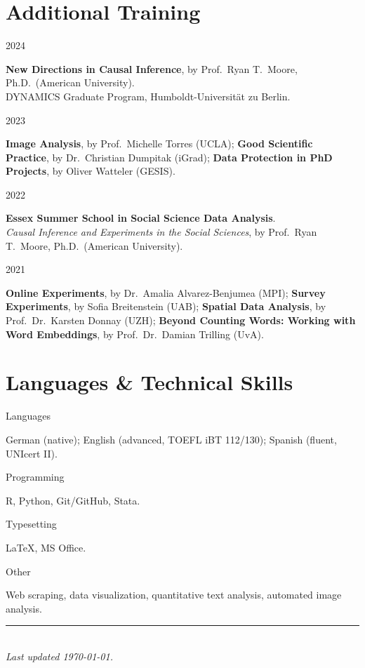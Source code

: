 \documentclass[11pt,a4paper]{article}
\newlength{\cvleftw}\setlength{\cvleftw}{0.20\textwidth}
\newlength{\cvrightw}\setlength{\cvrightw}{0.76\textwidth}
\newlength{\cvgap}\setlength{\cvgap}{0.02\textwidth}
\newenvironment{cventries}{\par\setlength{\parskip}{0pt}}{\par}
\newcommand{\cvitem}[2]{%
  \par\nopagebreak[2]%
  \noindent
  \begin{minipage}[t]{\cvleftw}\raggedright\color{cvmuted}\small\vspace{0pt}\strut #1\end{minipage}%
  \hspace{\cvgap}%
  \begin{minipage}[t]{\cvrightw}\raggedright\vspace{0pt}\strut #2\end{minipage}%
  \par\vspace{10pt plus 3pt minus 2pt}%
}
\newcommand{\cvtitle}[1]{\textbf{#1}}
\begin{document}
\section*{Additional Training}
\begin{cventries}
\cvitem{2024}{%
  \cvtitle{New Directions in Causal Inference}, by Prof.\ Ryan T.\ Moore, Ph.D.\ (American University).\\
  DYNAMICS Graduate Program, Humboldt-Universit\"at zu Berlin.}
\cvitem{2023}{%
  \cvtitle{Image Analysis}, by Prof.\ Michelle Torres (UCLA);\enskip
  \cvtitle{Good Scientific Practice}, by Dr.\ Christian Dumpitak (iGrad);\enskip
  \cvtitle{Data Protection in PhD Projects}, by Oliver Watteler (GESIS).}
\cvitem{2022}{%
  \cvtitle{Essex Summer School in Social Science Data Analysis}.\\
  \emph{Causal Inference and Experiments in the Social Sciences}, by Prof.\ Ryan T.\ Moore, Ph.D.\ (American University).}
\cvitem{2021}{%
  \cvtitle{Online Experiments}, by Dr.\ Amalia Alvarez-Benjumea (MPI);\enskip
  \cvtitle{Survey Experiments}, by Sofia Breitenstein (UAB);\enskip
  \cvtitle{Spatial Data Analysis}, by Prof.\ Dr.\ Karsten Donnay (UZH);\enskip
  \cvtitle{Beyond Counting Words: Working with Word Embeddings}, by Prof.\ Dr.\ Damian Trilling (UvA).}
\end{cventries}

\section*{Languages \& Technical Skills}
\begin{cventries}
\cvitem{Languages}{%
  German (native);\enskip
  English (advanced, TOEFL iBT 112/130);\enskip
  Spanish (fluent, UNIcert II).}
\cvitem{Programming}{R, Python, Git/GitHub, Stata.}
\cvitem{Typesetting}{\LaTeX, MS Office.}
\cvitem{Other}{Web scraping, data visualization, quantitative text analysis, automated image analysis.}
\end{cventries}

\vspace{6pt}
\begin{center}
  {\color{cvrule}\rule{0.30\textwidth}{0.4pt}}\\[3pt]
  {\footnotesize\color{cvmuted}\itshape Last updated \today.}
\end{center}
\end{document}
